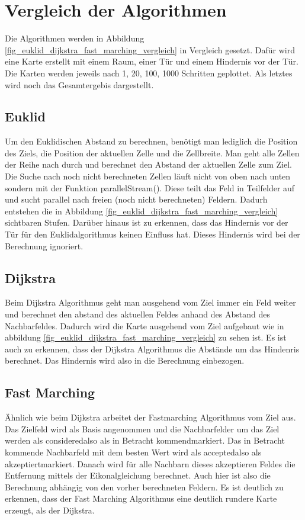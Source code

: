\section{Vergleich der Algorithmen}
Die Algorithmen werden in Abbildung \ref{fig_euklid_dijkstra_fast_marching_vergleich} in Vergleich gesetzt. Dafür wird eine Karte erstellt mit einem Raum, einer Tür und einem Hindernis vor der Tür. Die Karten werden jeweils nach 1, 20, 100, 1000 Schritten geplottet. Als letztes wird noch das Gesamtergebis dargestellt.

\subsection{Euklid}
Um den Euklidischen Abstand zu berechnen, benötigt man lediglich die Position des Ziels, die Position der aktuellen Zelle und die Zellbreite. Man geht alle Zellen der Reihe nach durch und berechnet den Abstand der aktuellen Zelle zum Ziel. Die Suche nach noch nicht berechneten Zellen läuft nicht von oben nach unten sondern mit der Funktion \glqq parallelStream()\grqq . Diese teilt das Feld in Teilfelder auf und sucht parallel nach freien (noch nicht berechneten) Feldern. Dadurh entstehen die in Abbildung \ref{fig_euklid_dijkstra_fast_marching_vergleich} sichtbaren Stufen. \cite{JavaParallelism} Darüber hinaus ist zu erkennen, dass das Hindernis vor der Tür für den Euklidalgorithmus keinen Einfluss hat. Dieses Hindernis wird bei der Berechnung ignoriert.

\subsection{Dijkstra}
Beim Dijkstra Algorithmus geht man ausgehend vom Ziel immer ein Feld weiter und berechnet den abstand des aktuellen Feldes anhand des Abstand des Nachbarfeldes. Dadurch wird die Karte ausgehend vom Ziel aufgebaut wie in abbildung \ref{fig_euklid_dijkstra_fast_marching_vergleich} zu sehen ist. Es ist auch zu erkennen, dass der Dijkstra Algorithmus die Abstände um das Hindenris berechnet. Das Hindernis wird also in die Berechnung einbezogen.

\subsection{Fast Marching}
Ähnlich wie beim Dijkstra arbeitet der Fastmarching Algorithmus vom Ziel aus. Das Zielfeld wird als Basis angenommen und die Nachbarfelder um das Ziel werden als \glqq considered\grqq also als \glqq in Betracht kommend\grqq markiert. Das in Betracht kommende Nachbarfeld mit dem besten Wert wird als \glqq accepted\grqq also als \glqq akzeptiert\grqq markiert. Danach wird für alle Nachbarn dieses akzeptieren Feldes die Entfernung mittels der Eikonalgleichung berechnet. Auch hier ist also die Berechnung abhängig von den vorher berechneten Feldern. Es ist deutlich zu erkennen, dass der Fast Marching Algorithmus eine deutlich rundere Karte erzeugt, als der Dijkstra.

